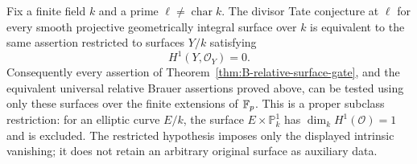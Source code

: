\begin{theorem}
\label{thm:B-irregularity-zero-surface-gate}
Fix a finite field \(k\) and a prime \(\ell\ne\operatorname{char}k\).
The divisor Tate conjecture at \(\ell\) for every smooth projective
geometrically integral surface over \(k\) is equivalent to the same
assertion restricted to surfaces \(Y/k\) satisfying
\[
                         H^1(Y,\mathcal O_Y)=0.
\]
Consequently every assertion of
Theorem~\ref{thm:B-relative-surface-gate}, and the equivalent universal
relative Brauer assertions proved above, can be tested using only
these surfaces over the finite extensions of \(\mathbb F_p\).
This is a proper subclass restriction: for an elliptic curve \(E/k\),
the surface \(E\times\mathbb P^1_k\) has
\(\dim_kH^1(\mathcal O)=1\) and is excluded.  The restricted hypothesis
imposes only the displayed intrinsic vanishing; it does not retain
an arbitrary original surface as auxiliary data.
\end{theorem}

